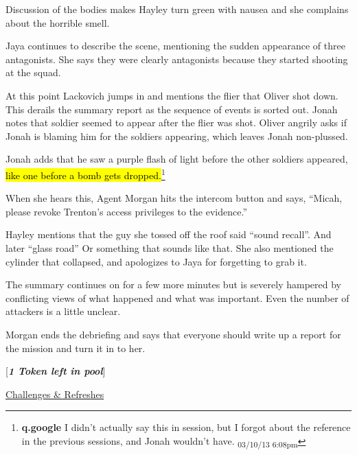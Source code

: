 Discussion of the bodies makes Hayley turn green with nausea and she complains about the horrible smell.  



Jaya continues to describe the scene, mentioning the sudden appearance of three antagonists.  She says they were clearly antagonists because they started shooting at the squad.



At this point Lackovich jumps in and mentions the flier that Oliver shot down.  This derails the summary report as the sequence of events is sorted out.  Jonah notes that soldier seemed to appear after the flier was shot.  Oliver angrily asks if Jonah is blaming him for the soldiers appearing, which leaves Jonah non-plussed.



Jonah adds that he saw a purple flash of light before the other soldiers appeared, \hl{like one before a bomb gets dropped.}\footnote{\textbf{q.google }I didn't actually say this in session, but I forgot about the reference in the previous sessions, and Jonah wouldn't have. \textsubscript{03/10/13 6:08pm}}



When she hears this, Agent Morgan hits the intercom button and says, ``Micah, please revoke Trenton's access privileges to the evidence.''



Hayley mentions that the guy she tossed off the roof said ``sound recall''.  And later ``glass road''  Or something that sounds like that.  She also mentioned the cylinder that collapsed, and apologizes to Jaya for forgetting to grab it.  



The summary continues on for a few more minutes but is severely hampered by conflicting views of what happened and what was important.  Even the number of attackers is a little unclear.



Morgan ends the debriefing and says that everyone should write up a report for the mission and turn it in to her.



{[}\textit{\textbf{1 Token left in pool}}{]}





\underline{  {\LARGE Challenges \& Refreshes }  }



